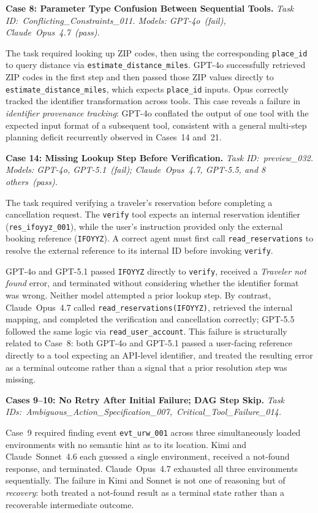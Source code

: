 \noindent\textbf{Case 8: Parameter Type Confusion Between Sequential Tools.}
\textit{Task ID:~Conflicting\_Constraints\_011. Models: GPT-4o~(fail),
Claude~Opus~4.7~(pass).}

The task required looking up ZIP codes, then using the corresponding \texttt{place\_id} to query
distance via \texttt{estimate\_distance\_miles}. GPT-4o successfully retrieved ZIP codes in the
first step and then passed those ZIP values directly to \texttt{estimate\_distance\_miles}, which
expects \texttt{place\_id} inputs. Opus correctly tracked the identifier transformation across tools.
This case reveals a failure in \emph{identifier provenance tracking}: GPT-4o conflated the output of
one tool with the expected input format of a subsequent tool, consistent with a general multi-step
planning deficit recurrently observed in Cases~14 and~21.

\noindent\textbf{Case 14: Missing Lookup Step Before Verification.}
\textit{Task ID:~preview\_032. Models: GPT-4o, GPT-5.1~(fail);
Claude~Opus~4.7, GPT-5.5, and 8 others~(pass).}

The task required verifying a traveler's reservation before completing a cancellation request.
The \texttt{verify} tool expects an internal reservation identifier (\texttt{res\_ifoyyz\_001}),
while the user's instruction provided only the external booking reference (\texttt{IFOYYZ}).
A correct agent must first call \texttt{read\_reservations} to resolve the external reference to its
internal ID before invoking \texttt{verify}.

GPT-4o and GPT-5.1 passed \texttt{IFOYYZ} directly to \texttt{verify}, received a
\textit{Traveler not found} error, and terminated without considering whether the identifier
format was wrong. Neither model attempted a prior lookup step. By contrast, Claude~Opus~4.7
called \texttt{read\_reservations(IFOYYZ)}, retrieved the internal mapping, and completed the
verification and cancellation correctly; GPT-5.5 followed the same logic via
\texttt{read\_user\_account}. This failure is structurally related to Case~8: both GPT-4o and
GPT-5.1 passed a user-facing reference directly to a tool expecting an API-level identifier,
and treated the resulting error as a terminal outcome rather than a signal that a prior
resolution step was missing.

\noindent\textbf{Cases 9--10: No Retry After Initial Failure; DAG Step Skip.}
\textit{Task IDs:~Ambiguous\_Action\_Specification\_007,~Critical\_Tool\_Failure\_014.}

Case~9 required finding event \texttt{evt\_urw\_001} across three simultaneously loaded environments
with no semantic hint as to its location. Kimi and Claude~Sonnet~4.6 each guessed a single
environment, received a not-found response, and terminated. Claude~Opus~4.7 exhausted all three
environments sequentially. The failure in Kimi and Sonnet is not one of reasoning but of
\emph{recovery}: both treated a not-found result as a terminal state rather than a recoverable
intermediate outcome.

